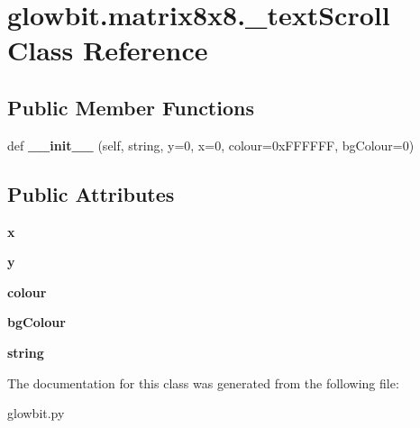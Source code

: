 \hypertarget{classglowbit_1_1matrix8x8_1_1__textScroll}{}\section{glowbit.\+matrix8x8.\+\_\+text\+Scroll Class Reference}
\label{classglowbit_1_1matrix8x8_1_1__textScroll}
\subsection*{Public Member Functions}
\begin{DoxyCompactItemize}
\item 
\mbox{\label{classglowbit_1_1matrix8x8_1_1__textScroll_abb9d783fc6a3036b7081f15d979be75f}} 
def {\bfseries \+\_\+\+\_\+init\+\_\+\+\_\+} (self, string, y=0, x=0, colour=0x\+F\+F\+F\+F\+F\+F, bg\+Colour=0)
\end{DoxyCompactItemize}
\subsection*{Public Attributes}
\begin{DoxyCompactItemize}
\item 
\mbox{\label{classglowbit_1_1matrix8x8_1_1__textScroll_a38a68239471b7ebc153ad4c099a8548c}} 
{\bfseries x}
\item 
\mbox{\label{classglowbit_1_1matrix8x8_1_1__textScroll_afa2da8149656706f50983ae2c6f7b89b}} 
{\bfseries y}
\item 
\mbox{\label{classglowbit_1_1matrix8x8_1_1__textScroll_a775c6a5c578d94868712075a1e4e656f}} 
{\bfseries colour}
\item 
\mbox{\label{classglowbit_1_1matrix8x8_1_1__textScroll_a2e66cccebf9420e730994b6788bdb061}} 
{\bfseries bg\+Colour}
\item 
\mbox{\label{classglowbit_1_1matrix8x8_1_1__textScroll_a19db578920ea8298ecec98759fb3bb19}} 
{\bfseries string}
\end{DoxyCompactItemize}


The documentation for this class was generated from the following file\+:\begin{DoxyCompactItemize}
\item 
glowbit.\+py\end{DoxyCompactItemize}
